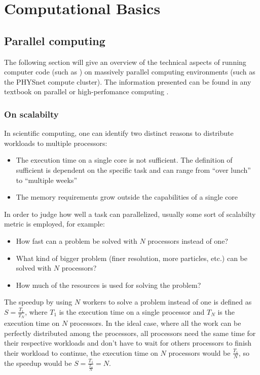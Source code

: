 \documentclass[main.tex]{subfiles}
\begin{document}
\chapter{Computational Basics\label{ch:computation}}

\section{Parallel computing\label{sec:parallel_computing}}

The following section will give an overview of the technical aspects of running computer code (such as \QE) on massively parallel computing environments (such as the PHYSnet compute cluster).
The information presented can be found in any textbook on parallel or high-perfomance computing \cite{hager_introduction_2010}.

\subsection{On scalabilty}

In scientific computing, one can identify two distinct reasons to distribute workloads to multiple processors:
\begin{itemize}
    \item The execution time on a single core is not sufficient. The definition of sufficient is dependent on the specific task and can range from \enquote{over lunch} to \enquote{multiple weeks}
    \item The memory requirements grow outside the capabilities of a single core
\end{itemize}
In order to judge how well a task can parallelized, usually some sort of scalabilty metric is employed, for example:
\begin{itemize}
    \item How fast can a problem be solved with \(N\) processors instead of one?
    \item What kind of bigger problem (finer resolution, more particles, etc.) can be solved with \(N\) processors?
    \item How much of the resources is used for solving the problem?
\end{itemize}
The speedup by using \(N\) workers to solve a problem instead of one is defined as \(S = \frac{T_1}{T_N}\), where \(T_1\) is the execution time on a single processor and \(T_N\) is the execution time on \(N\) processors.
In the ideal case, where all the work can be perfectly distributed among the processors, all processors need the same time for their respective workloads and don't have to wait for others processors to finish their workload to continue, the execution time on \(N\) processors would be \(\frac{T_1}{N}\), so the speedup would be \(S = \frac{T_1}{\frac{T_1}{N}} = N\).
\end{document}
